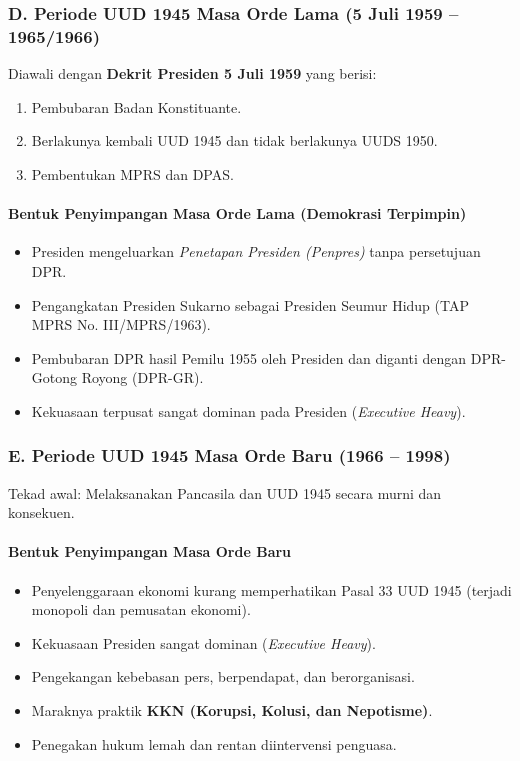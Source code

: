 \subsubsection{D. Periode UUD 1945 Masa Orde Lama (5 Juli 1959 -- 1965/1966)}
Diawali dengan \textbf{Dekrit Presiden 5 Juli 1959} yang berisi:
\begin{enumerate}
    \item Pembubaran Badan Konstituante.
    \item Berlakunya kembali UUD 1945 dan tidak berlakunya UUDS 1950.
    \item Pembentukan MPRS dan DPAS.
\end{enumerate}

\paragraph{Bentuk Penyimpangan Masa Orde Lama (Demokrasi Terpimpin)}
\begin{itemize}
    \item Presiden mengeluarkan \textit{Penetapan Presiden (Penpres)} tanpa persetujuan DPR.
    \item Pengangkatan Presiden Sukarno sebagai Presiden Seumur Hidup (TAP MPRS No. III/MPRS/1963).
    \item Pembubaran DPR hasil Pemilu 1955 oleh Presiden dan diganti dengan DPR-Gotong Royong (DPR-GR).
    \item Kekuasaan terpusat sangat dominan pada Presiden (\textit{Executive Heavy}).
\end{itemize}

\subsubsection{E. Periode UUD 1945 Masa Orde Baru (1966 -- 1998)}
Tekad awal: Melaksanakan Pancasila dan UUD 1945 secara murni dan konsekuen.

\paragraph{Bentuk Penyimpangan Masa Orde Baru}
\begin{itemize}
    \item Penyelenggaraan ekonomi kurang memperhatikan Pasal 33 UUD 1945 (terjadi monopoli dan pemusatan ekonomi).
    \item Kekuasaan Presiden sangat dominan (\textit{Executive Heavy}).
    \item Pengekangan kebebasan pers, berpendapat, dan berorganisasi.
    \item Maraknya praktik \textbf{KKN (Korupsi, Kolusi, dan Nepotisme)}.
    \item Penegakan hukum lemah dan rentan diintervensi penguasa.
\end{itemize}



